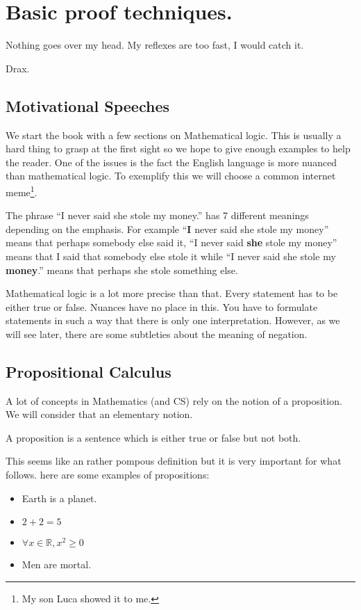 \chapter{Basic proof techniques.}\label{chap:Basicproof}
\epigraph{Nothing goes over my head. My reflexes are too fast, I would catch it.}{ Drax.}

\section{Motivational Speeches}
We start the book with a  few sections on Mathematical logic. This is usually a hard thing to grasp at the first sight so we hope to give enough examples to help the reader.
One of the issues is the fact the English language is more nuanced than mathematical logic. To exemplify this we will choose a common   internet meme\footnote{My son Luca showed it to me.}. 

The phrase
``I never said she stole my money.'' has 7 different meanings depending on the emphasis. For example ``{\bf I } never said she stole my money'' means that perhaps somebody else said it, ``I never said {\bf she} stole my money'' means that I said that somebody else stole it  while ``I never said she stole my {\bf money}.'' means that perhaps she stole something else.

 Mathematical logic is a lot more precise than that. Every statement has to be either true or false. Nuances have no place in this. You have to formulate statements in such a way that there is only one interpretation. However, as we will see later, there are some subtleties about the meaning of negation.



\section{Propositional Calculus}

A lot of concepts in Mathematics (and CS) rely on the notion of a proposition. We will consider that an elementary notion.

\begin{Definition}
A proposition is a sentence which is either true or false but not both.
\end{Definition}

This seems like an rather pompous definition but it is very important for what follows. here are some examples of propositions:
\begin{itemize}
\item Earth is a planet.
\item $2+2=5$
\item $\forall x \in \mathbb{R}, x^2 \ge 0$
\item Men are mortal.
\end{itemize}

